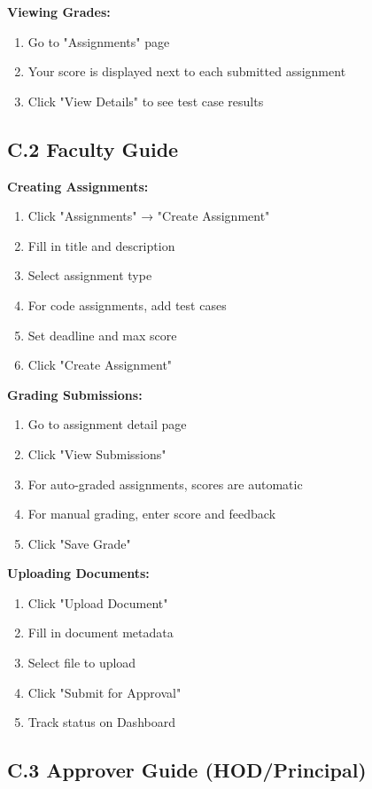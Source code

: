 \textbf{Viewing Grades:}
\begin{enumerate}
\item Go to "Assignments" page
\item Your score is displayed next to each submitted assignment
\item Click "View Details" to see test case results
\end{enumerate}

\subsection{C.2 Faculty Guide}

\textbf{Creating Assignments:}
\begin{enumerate}
\item Click "Assignments" → "Create Assignment"
\item Fill in title and description
\item Select assignment type
\item For code assignments, add test cases
\item Set deadline and max score
\item Click "Create Assignment"
\end{enumerate}

\textbf{Grading Submissions:}
\begin{enumerate}
\item Go to assignment detail page
\item Click "View Submissions"
\item For auto-graded assignments, scores are automatic
\item For manual grading, enter score and feedback
\item Click "Save Grade"
\end{enumerate}

\textbf{Uploading Documents:}
\begin{enumerate}
\item Click "Upload Document"
\item Fill in document metadata
\item Select file to upload
\item Click "Submit for Approval"
\item Track status on Dashboard
\end{enumerate}

\subsection{C.3 Approver Guide (HOD/Principal)}

